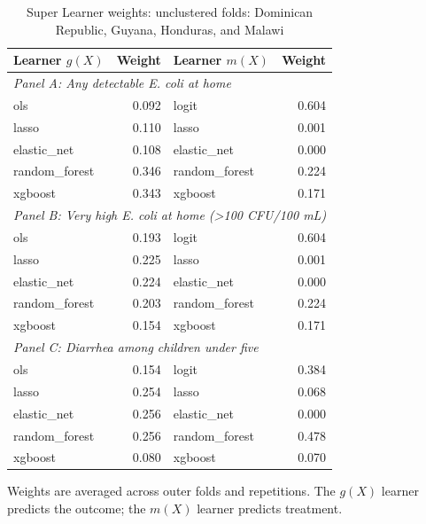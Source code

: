 \begin{table}[htbp]
\centering
\caption{Super Learner weights: unclustered folds: Dominican Republic, Guyana, Honduras, and Malawi}
\label{tab:super-learner-weights-unclustered-selected-countries}
\small
\begin{tabular}{lrlr}
\toprule
Learner $g(X)$ & Weight & Learner $m(X)$ & Weight \\
\midrule
\multicolumn{4}{l}{\textit{Panel A: Any detectable E. coli at home}} \\
ols & 0.092 & logit & 0.604 \\
lasso & 0.110 & lasso & 0.001 \\
elastic\_net & 0.108 & elastic\_net & 0.000 \\
random\_forest & 0.346 & random\_forest & 0.224 \\
xgboost & 0.343 & xgboost & 0.171 \\
\midrule
\multicolumn{4}{l}{\textit{Panel B: Very high E. coli at home (>100 CFU/100 mL)}} \\
ols & 0.193 & logit & 0.604 \\
lasso & 0.225 & lasso & 0.001 \\
elastic\_net & 0.224 & elastic\_net & 0.000 \\
random\_forest & 0.203 & random\_forest & 0.224 \\
xgboost & 0.154 & xgboost & 0.171 \\
\midrule
\multicolumn{4}{l}{\textit{Panel C: Diarrhea among children under five}} \\
ols & 0.154 & logit & 0.384 \\
lasso & 0.254 & lasso & 0.068 \\
elastic\_net & 0.256 & elastic\_net & 0.000 \\
random\_forest & 0.256 & random\_forest & 0.478 \\
xgboost & 0.080 & xgboost & 0.070 \\
\bottomrule
\end{tabular}
\par\vspace{3pt}
\begin{minipage}{0.9\linewidth}\footnotesize Weights are averaged across outer folds and repetitions. The $g(X)$ learner predicts the outcome; the $m(X)$ learner predicts treatment.\end{minipage}
\end{table}